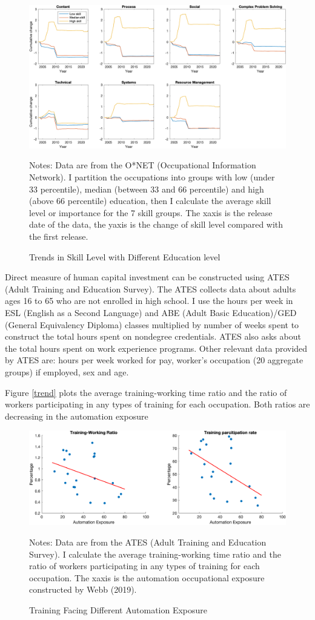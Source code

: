 \documentclass[12pt]{article}
\begin{document}
\begin{figure}[h!]
\includegraphics[width = \textwidth]{LV_trend2}
\caption{Trends in Skill Level with Different Education level}
\label{LV_trend2}
{\scriptsize Notes: Data are from the O*NET (Occupational Information Network). I partition the occupations into groups with low (under 33 percentile), median (between 33 and 66 percentile) and high (above 66 percentile) education, then I calculate the average skill level or importance for the 7 skill groups. The xaxis is the release date of the data, the yaxis is the change of skill level compared with the first release. }
\end{figure}

Direct measure of human capital investment can be constructed using ATES (Adult Training and Education Survey). The ATES collects data about adults ages 16 to 65 who are not enrolled in high school. I use the hours per week in ESL (English as a Second Language) and ABE (Adult Basic Education)/GED (General Equivalency Diploma) classes multiplied by number of weeks spent to construct the total hours spent on nondegree credentials. ATES also asks about the total hours spent on work experience programs. Other relevant data provided by ATES are: hours per week worked for pay, worker's occupation (20 aggregate groups) if employed, sex and age. 

Figure \ref{trend} plots the average training-working time ratio and the ratio of workers participating in any types of training for each occupation. Both ratios are decreasing in the automation exposure 
\begin{figure}[h!]
\includegraphics[width = \textwidth]{train}
\caption{Training Facing Different Automation Exposure}
{\scriptsize Notes: Data are from the ATES (Adult Training and Education Survey). I calculate the average training-working time ratio and the ratio of workers participating in any types of training for each occupation. The xaxis is the automation occupational exposure constructed by Webb (2019).}
\label{train}
\end{figure}
\end{document}
